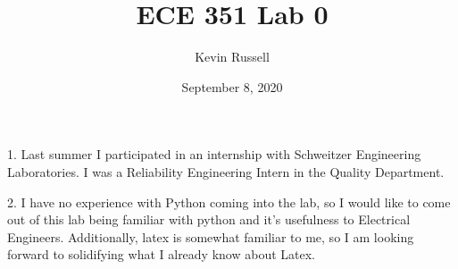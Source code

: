\documentclass{article}
\title{ECE 351 Lab 0}
\author{Kevin Russell }
\date{September 8, 2020}
\begin{document}
\maketitle

1. Last summer I participated in an internship with Schweitzer Engineering Laboratories.  I was a Reliability Engineering Intern in the Quality Department.


2. I have no experience with Python coming into the lab, so I would like to come out of this lab being familiar with python and it's usefulness to Electrical Engineers.  Additionally, latex is somewhat familiar to me, so I am looking forward to solidifying what I already know about Latex.
\end{document}
